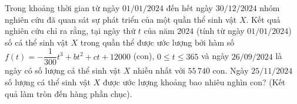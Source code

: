 \begin{ex}
Trong khoảng thời gian từ ngày $01/01/2024$ đến hết ngày $30/12/2024$ nhóm nghiên cứu đã quan sát sự phát triển của một quần thể sinh vật $X$. Kết quả nghiên cứu chỉ ra rằng, tại ngày thứ $t$ của năm $2024$ (tính từ ngày $01/01/2024$) số cá thể sinh vật $X$ trong quần thể được ước lượng bởi hàm số $f(t)=-\dfrac1{300}t^3+bt^2+ct+12000$ (con), $0\le t\le365$ và ngày $26/09/2024$ là ngày có số lượng cá thể sinh vật $X$ nhiều nhất với $55\,740$ con. Ngày $25/11/2024$ số lượng cá thể sinh vật $X$ được ước lượng khoảng bao nhiêu nghìn con? (Kết quả làm tròn đến hàng phần chục).
\end{ex}
